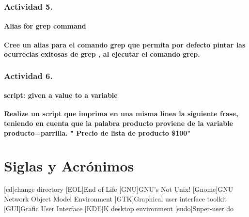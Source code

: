 \documentclass[a4paper,11pt,spanish]{article} %
\begin{document}
\subsection{Actividad 5.}

\subsubsection{Alias for grep command}

\textbf{Cree un alias para el comando grep que permita por defecto pintar las
ocurrecias exitosas de grep , al ejecutar el comando grep.}

\subsection{Actividad 6.}

\subsubsection{script: given a value to a variable}

\textbf{Realize un script que imprima en una misma linea la siguiente frase, teniendo en cuenta
que la palabra producto proviene de la variable producto=parrilla.
" Precio de lista de producto \$100"}

\pagebreak



\pagebreak

\chapter{\Large{\textbf{Siglas y Acr\'onimos}}}

\begin{acronym}

[cd]{change directory}
[EOL]{End of Life}
[GNU]{GNU's Not Unix!}
[Gnome]{GNU Network Object Model Environment}
[GTK]{Graphical user interface toolkit}
[GUI]{Grafic User Interface}
[KDE]{K desktop environment}
[sudo]{Super-user do}


\end{acronym}
\end{document}
